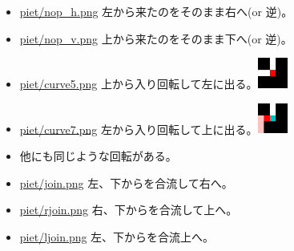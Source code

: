 \documentclass[twocolumn,8pt,b5paper]{extarticle}
\begin{document}
\begin{itemize}
\setlength{\parskip}{0cm}
\setlength{\itemsep}{0cm}
\item \href{https://github.com/nna774/piet-automata/blob/master/piet/nop\_h.png}{piet/nop\_h.png} 左から来たのをそのまま右へ(or 逆)。
\item \href{https://github.com/nna774/piet-automata/blob/master/piet/nop\_v.png}{piet/nop\_v.png} 上から来たのをそのまま下へ(or 逆)。
\item \href{https://github.com/nna774/piet-automata/blob/master/piet/curve5.png}{piet/curve5.png} 上から入り回転して左に出る。\includegraphics[width=1cm,clip]{images/curve5.png}
\item \href{https://github.com/nna774/piet-automata/blob/master/piet/curve7.png}{piet/curve7.png} 左から入り回転して上に出る。\includegraphics[width=1cm,clip]{images/curve7.png}
\item 他にも同じような回転がある。
\item \href{https://github.com/nna774/piet-automata/blob/master/piet/join.png}{piet/join.png} 左、下からを合流して右へ。
\item \href{https://github.com/nna774/piet-automata/blob/master/piet/rjoin.png}{piet/rjoin.png} 右、下からを合流して上へ。
\item \href{https://github.com/nna774/piet-automata/blob/master/piet/ljoin.png}{piet/ljoin.png} 左、下からを合流上へ。
\end{itemize}
\end{document}
